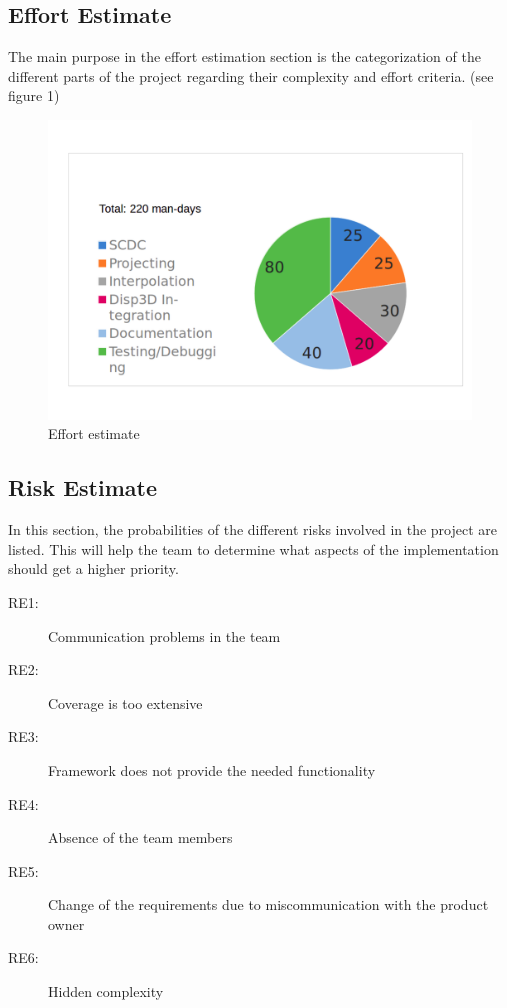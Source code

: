 \subsection{Effort Estimate}
The main purpose in the effort estimation section is the categorization of the different parts of the project regarding their complexity and effort criteria.  
 (see figure 1)

\begin{figure}[h]
	\begin{center}
		\includegraphics[width= 14cm]{figures/Aufwandsabschaetzung.pdf}
		\caption{Effort estimate}
	\end{center}
\end{figure}

\clearpage

\subsection{Risk Estimate}
In this section, the probabilities of the different risks involved in the project are listed. This will help the team to determine what aspects of the implementation should get a higher priority.

\begin{description}
	\item[RE1:] Communication problems in the team
	\item[RE2:] Coverage is too extensive
	\item[RE3:] Framework does not provide the needed functionality 
	\item[RE4:] Absence of the team members 
	\item[RE5:] Change of the requirements due to miscommunication with the product owner 
	\item[RE6:] Hidden complexity 
\end{description}

